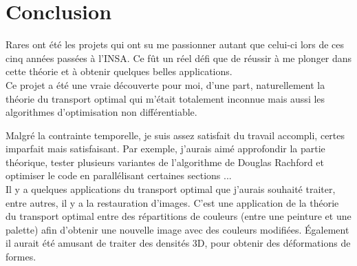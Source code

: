 \documentclass[a4paper,12pt]{article}
\begin{document}
\newpage
\section{Conclusion}

Rares ont été les projets qui ont su me passionner autant que celui-ci lors de ces cinq années passées à l'INSA. Ce fût un réel défi que de réussir à me plonger dans cette théorie et à obtenir quelques belles applications. \\

Ce projet a été une vraie découverte pour moi, d'une part, naturellement la théorie du transport optimal qui m'était totalement inconnue mais aussi les algorithmes d'optimisation non différentiable.

Malgré la contrainte temporelle, je suis assez satisfait du travail accompli, certes imparfait mais satisfaisant. Par exemple, j'aurais aimé approfondir la partie théorique, tester plusieurs variantes de l'algorithme de Douglas Rachford et optimiser le code en parallélisant certaines sections ... \\

Il y a quelques applications du transport optimal que j'aurais souhaité traiter, entre autres, il y a la restauration d'images. C'est une application de la théorie du transport optimal entre des répartitions de couleurs (entre une peinture et une palette) afin d'obtenir une nouvelle image avec des couleurs modifiées. Également il aurait été amusant de traiter des densités 3D, pour obtenir des déformations de formes. 
\end{document}
